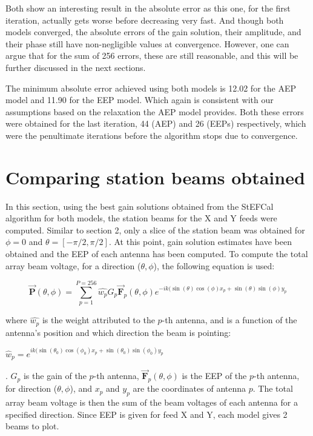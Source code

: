 \documentclass[12pt]{report} %
\begin{document}
Both show an interesting result in the absolute error as this one, for the first iteration, actually gets worse before decreasing very fast. And though both models converged, the absolute errors of the gain solution, their amplitude, and their phase still have non-negligible values at convergence. However, one can argue that for the sum of 256 errors, these are still reasonable, and this will be further discussed in the next sections.

The minimum absolute error achieved using both models is 12.02 for the AEP model and 11.90 for the EEP model. Which again is consistent with our assumptions based on the relaxation the AEP model provides. Both these errors were obtained for the last iteration, 44 (AEP) and 26 (EEPs) respectively, which were the penultimate iterations before the algorithm stops due to convergence.

\section{Comparing station beams obtained}

In this section, using the best gain solutions obtained from the StEFCal algorithm for both models, the station beams for the X and Y feeds were computed. Similar to section 2, only a slice of the station beam was obtained for $\phi = 0$ and $\theta = [-\pi/2, \pi/2]$. At this point, gain solution estimates have been obtained and the EEP of each antenna has been computed. To compute the total array beam voltage, for a direction ($\theta, \phi$), the following equation is used:

\begin{equation}
    \vec{\mathbf{P}}(\theta, \phi) = \sum_{p = 1}^{P = 256} \hat{w_{p}} G_{p} \vec{\mathbf{F}}_{p}(\theta, \phi) e^{-ik(\sin(\theta)\cos(\phi)x_{p} + \sin(\theta)\sin(\phi)y_{p}}
\end{equation}

where $\hat{w_{p}}$ is the weight attributed to the $p$-th antenna, and is a function of the antenna's position and which direction the beam is pointing:

\begin{centering}
  $\hat{w}_{p} = e^{ik(\sin(\theta_{0})\cos(\phi_{0})x_{p} + \sin(\theta_{0})\sin(\phi_{0})y_{p}}$
\end{centering}.
$G_{p}$ is the gain of the $p$-th antenna, $\vec{\mathbf{F}}_{p}(\theta, \phi)$ is the EEP of the $p$-th antenna, for direction ($\theta, \phi$), and $x_{p}$ and $y_{p}$ are the coordinates of antenna $p$. The total array beam voltage is then the sum of the beam voltages of each antenna for a specified direction. Since EEP is given for feed X and Y, each model gives 2 beams to plot.
\end{document}
